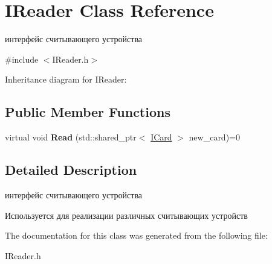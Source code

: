 \hypertarget{classIReader}{}\section{I\+Reader Class Reference}
\label{classIReader}


интерфейс считывающего устройства  




{\ttfamily \#include $<$I\+Reader.\+h$>$}



Inheritance diagram for I\+Reader\+:
\subsection*{Public Member Functions}
\begin{DoxyCompactItemize}
\item 
virtual void {\bfseries Read} (std\+::shared\+\_\+ptr$<$ \hyperlink{classICard}{I\+Card} $>$ new\+\_\+card)=0\hypertarget{classIReader_a4d52a6dc2db1f99c6ee1f304fd4da807}{}\label{classIReader_a4d52a6dc2db1f99c6ee1f304fd4da807}

\end{DoxyCompactItemize}


\subsection{Detailed Description}
интерфейс считывающего устройства 

Используется для реализации различных считывающих устройств 

The documentation for this class was generated from the following file\+:\begin{DoxyCompactItemize}
\item 
I\+Reader.\+h\end{DoxyCompactItemize}
